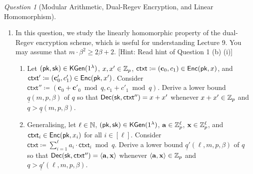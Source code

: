 \documentclass[10pt,twoside]{article}
\newif\ifsolution
\newcommand{\inputsol}[1]{\ifsolution\begin{tcolorbox}[breakable]\end{tcolorbox}\fi}
\theoremstyle{remark}
\newtheorem{question}{Question}
\newcommand{\ctxt}{\mathsf{ctxt}}
\renewcommand{\vec}[1]{\mathbf{#1}}
\begin{document}
\begin{question}[Modular Arithmetic, Dual-Regev Encryption, and Linear Homomorphism]
\begin{enumerate}[label=(\alph*)]
    \item In this question, we study the linearly homomorphic property of the dual-Regev encryption scheme, which is useful for understanding Lecture 9.
    You may assume that $m \cdot \beta^2 \geq 2 \beta + 2$. 
    [Hint: Read hint of Question 1 (b) (i)]
    \begin{enumerate}[label=(\roman*)]
        \item Let $(\pk, \sk) \in \kgen(\secparam)$, 
        $x, x' \in \mathbb{Z}_p$, 
        $\ctxt \coloneqq (\vec{c}_0, c_1) \in \enc(\pk, x)$, and 
        $\ctxt' \coloneqq (\vec{c}'_0, c'_1) \in \enc(\pk, x')$. 
        Consider $\ctxt'' \coloneqq (\vec{c}_0 + \vec{c}'_0 \bmod q, c_1 + c'_1 \bmod q)$.
        Derive a lower bound $\underline{q}(m,p,\beta)$ of $q$ so that $\dec(\sk, \ctxt'') = x + x'$ whenever $x + x' \in \mathbb{Z}_p$ and $q > \underline{q}(m,p,\beta)$.
        \item Generalising, let $\ell \in \mathbb{N}$, 
        $(\pk, \sk) \in \kgen(\secparam)$, 
        $\vec{a} \in \ZZ_p^\ell$, $\vec{x} \in \ZZ_p^\ell$, and $\ctxt_i \in \enc(\pk, x_i)$ for all $i \in [\ell]$.
        Consider $\ctxt \coloneqq \sum_{i=1}^\ell a_i \cdot \ctxt_i \bmod q$.
        Derive a lower bound $\underline{q}'(\ell,m,p,\beta)$ of $q$ so that $\dec(\sk, \ctxt'') = \langle \vec{a}, \vec{x} \rangle$ whenever $\langle \vec{a}, \vec{x} \rangle \in \ZZ_p$ and $q > \underline{q}'(\ell,m,p,\beta)$.
    \end{enumerate} 

    
\end{enumerate}
\end{question}

\inputsol{dual_regev_homo}
\end{document}
